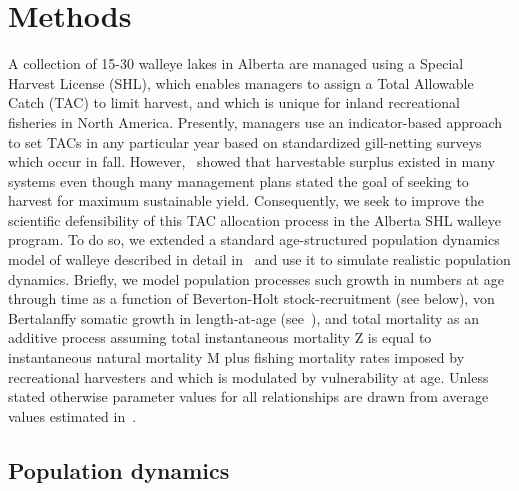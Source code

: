 \documentclass[floatfix,nofootinbib,longbibliography,notitlepage]{revtex4-2}
\begin{document}
%
%
%
\section{Methods}

A collection of 15-30 walleye lakes in Alberta are managed using a Special Harvest License (SHL), which enables managers to assign a Total Allowable Catch (TAC) to limit harvest, and which is unique for inland recreational fisheries in North America.  
Presently, managers use an indicator-based approach to set TACs in any particular year based on standardized gill-netting surveys which occur in fall.  
However,~\cite{cahill2022} showed that harvestable surplus existed in many systems even though many management plans stated the goal of seeking to harvest  for maximum sustainable yield.  
Consequently, we seek to improve the scientific defensibility of this TAC allocation process in the Alberta SHL walleye program. 
To do so, we extended a standard age-structured population dynamics model of walleye described in detail in~\cite{cahill2022} and use it to simulate realistic population dynamics.  
Briefly, we model population processes such growth in numbers at age through time as a function of Beverton-Holt stock-recruitment (see below), von Bertalanffy somatic growth in length-at-age (see~\cite{cahill2020spatial}), and total mortality as an additive process assuming total instantaneous mortality Z is equal to instantaneous natural mortality M plus fishing mortality rates imposed by recreational harvesters and which is modulated by vulnerability at age.  
Unless stated otherwise parameter values for all relationships are drawn from average values estimated in~\cite{cahill2020spatial}.

\subsection{Population dynamics}
\end{document}
